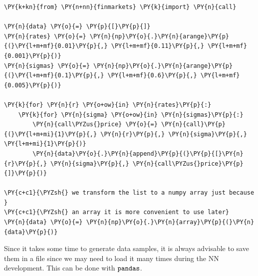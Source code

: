 \begin{tcolorbox}[breakable, size=fbox, boxrule=1pt, pad at break*=1mm,colback=cellbackground, colframe=cellborder]
\begin{Verbatim}[commandchars=\\\{\}]
\PY{k+kn}{from} \PY{n+nn}{finmarkets} \PY{k}{import} \PY{n}{call}
	
\PY{n}{data} \PY{o}{=} \PY{p}{[}\PY{p}{]}
\PY{n}{rates} \PY{o}{=} \PY{n}{np}\PY{o}{.}\PY{n}{arange}\PY{p}{(}\PY{l+m+mf}{0.01}\PY{p}{,} \PY{l+m+mf}{0.11}\PY{p}{,} \PY{l+m+mf}{0.001}\PY{p}{)}
\PY{n}{sigmas} \PY{o}{=} \PY{n}{np}\PY{o}{.}\PY{n}{arange}\PY{p}{(}\PY{l+m+mf}{0.1}\PY{p}{,} \PY{l+m+mf}{0.6}\PY{p}{,} \PY{l+m+mf}{0.005}\PY{p}{)}
	
\PY{k}{for} \PY{n}{r} \PY{o+ow}{in} \PY{n}{rates}\PY{p}{:}
    \PY{k}{for} \PY{n}{sigma} \PY{o+ow}{in} \PY{n}{sigmas}\PY{p}{:}
        \PY{n}{call\PYZus{}price} \PY{o}{=} \PY{n}{call}\PY{p}{(}\PY{l+m+mi}{1}\PY{p}{,} \PY{n}{r}\PY{p}{,} \PY{n}{sigma}\PY{p}{,} \PY{l+m+mi}{1}\PY{p}{)}
        \PY{n}{data}\PY{o}{.}\PY{n}{append}\PY{p}{(}\PY{p}{[}\PY{n}{r}\PY{p}{,} \PY{n}{sigma}\PY{p}{,} \PY{n}{call\PYZus{}price}\PY{p}{]}\PY{p}{)}
	
\PY{c+c1}{\PYZsh{} we transform the list to a numpy array just because }
\PY{c+c1}{\PYZsh{} an array it is more convenient to use later}
\PY{n}{data} \PY{o}{=} \PY{n}{np}\PY{o}{.}\PY{n}{array}\PY{p}{(}\PY{n}{data}\PY{p}{)}
\end{Verbatim}
\end{tcolorbox}

Since it takes some time to generate data samples, it is always
advisable to save them in a file since we may need to load it many times
during the NN development. This can be done with \(\tt{pandas}\).

